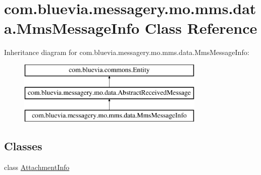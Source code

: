 \hypertarget{classcom_1_1bluevia_1_1messagery_1_1mo_1_1mms_1_1data_1_1MmsMessageInfo}{
\section{com.bluevia.messagery.mo.mms.data.MmsMessageInfo Class Reference}
\label{classcom_1_1bluevia_1_1messagery_1_1mo_1_1mms_1_1data_1_1MmsMessageInfo}
}
Inheritance diagram for com.bluevia.messagery.mo.mms.data.MmsMessageInfo:\begin{figure}[H]
\begin{center}
\leavevmode
\includegraphics[height=3.000000cm]{classcom_1_1bluevia_1_1messagery_1_1mo_1_1mms_1_1data_1_1MmsMessageInfo}
\end{center}
\end{figure}
\subsection*{Classes}
\begin{DoxyCompactItemize}
\item 
class \hyperlink{classcom_1_1bluevia_1_1messagery_1_1mo_1_1mms_1_1data_1_1MmsMessageInfo_1_1AttachmentInfo}{AttachmentInfo}
\end{DoxyCompactItemize}
